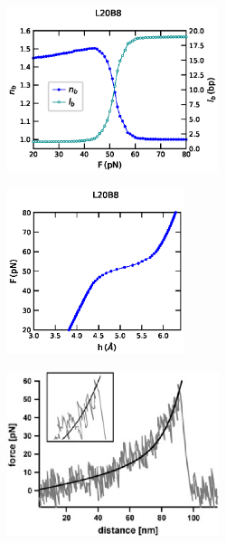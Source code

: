 \documentclass[12pt,masters,final]{UTRGVthesis}
\begin{document}
\begin{figure}[!h]
        \begin{subfigure}[b]{0.49\textwidth}
                \centering
                \includegraphics[height=1.9in, width=.8\textwidth]{L20B8_Gaub_force_bub.eps}
                \caption{}
                \label{fig:L20B8bub}
        \end{subfigure}%
        \hspace{1pt}
        \hfill
        \begin{subfigure}[b]{0.49\textwidth}
                \centering
                \includegraphics[height=1.9in, width=.8\textwidth]{L20B8_Gaub_force_extension.eps}
                \caption{}
                \label{fig:L20B8extension}
        \end{subfigure}%
        \hspace{1pt}
         \begin{subfigure}[b]{0.49\textwidth}
                \centering
                \includegraphics[height=1.9in, width=.8\textwidth]{Extension_Gaub_exp.eps}
                \caption{}
                \label{fig:L20B8exp}
        \end{subfigure}%
       

\end{figure}
\end{document}
